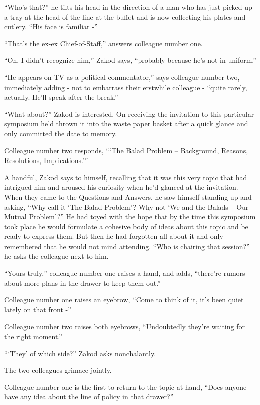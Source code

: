 \documentclass[twoside,11pt]{book}
\begin{document}
``Who's that?'' he tilts his head in the direction of a man who has just picked up a tray at
the head of the line at the buffet and is now collecting his plates and cutlery. ``His face is familiar
-''

``That's the ex-ex Chief-of-Staff,'' answers colleague number one.

``Oh, I didn't recognize him,'' Zakod says, ``probably because he's not in
uniform.''

``He appears on TV as a political commentator,'' says colleague number two, immediately adding
- not to embarrass their erstwhile colleague - ``quite rarely, actually. He'll speak after the
break.''

``What about?'' Zakod is interested. On receiving the invitation to this particular symposium
he'd thrown it into the waste paper basket after a quick glance and only committed the date to memory.

Colleague number two responds,
``\thinspace`The Balad Problem -- Background, Reasons, Resolutions,
Implications.'\thinspace''

A handful, Zakod says to himself, recalling that it was this very topic that had intrigued him and aroused his curiosity
when he'd glanced at the invitation. When they came to the
Questions-and-Answers, he saw himself standing up and asking, ``Why call it `The Balad
Problem'? Why not `We and the Balads -- Our Mutual Problem'?'' He had toyed with the hope that by the
time this symposium took place he would formulate a cohesive body of ideas about this topic and be
ready to express them. But then he had forgotten all about it and only remembered that he would not mind attending.
``Who is chairing that session?'' he asks the colleague next to him.

``Yours truly,'' colleague number one raises a hand, and adds, ``there're rumors
about more plans in the drawer to keep them out.''

Colleague number one raises an eyebrow, ``Come to think of it, it's been quiet lately on that front
-''

Colleague number two raises both eyebrows, ``Undoubtedly they're waiting for the
right moment.''

``\thinspace`They' of which side?'' Zakod asks nonchalantly.

The two colleagues grimace jointly.

Colleague number one is the first to return to the topic at hand, ``Does anyone have any idea about the
line of policy in that drawer?''
\end{document}
